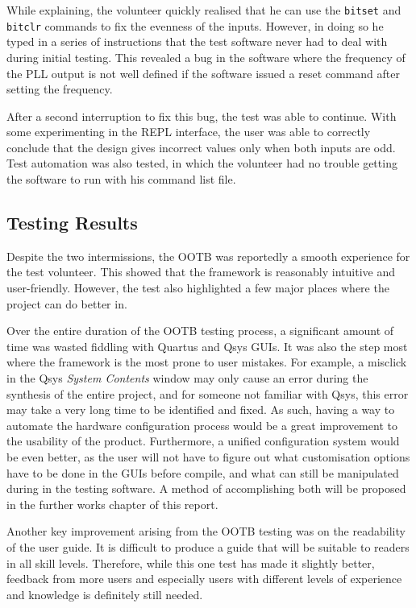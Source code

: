 While explaining, the volunteer quickly realised that he can use the \texttt{bitset} and \texttt{bitclr} commands to fix the evenness of the inputs.
However, in doing so he typed in a series of instructions that the test software never had to deal with during initial testing.
This revealed a bug in the software where the frequency of the PLL output is not well defined if the software issued a reset command after setting the frequency.

After a second interruption to fix this bug, the test was able to continue.
With some experimenting in the REPL interface, the user was able to correctly conclude that the design gives incorrect values only when both inputs are odd.
Test automation was also tested, in which the volunteer had no trouble getting the software to run with his command list file.

\subsection{Testing Results}
Despite the two intermissions, the OOTB was reportedly a smooth experience for the test volunteer.
This showed that the framework is reasonably intuitive and user-friendly.
However, the test also highlighted a few major places where the project can do better in.

Over the entire duration of the OOTB testing process, a significant amount of time was wasted fiddling with Quartus and Qsys GUIs.
It was also the step most where the framework is the most prone to user mistakes.
For example, a misclick in the Qsys \textit{System Contents} window may only cause an error during the synthesis of the entire project, and for someone not familiar with Qsys, this error may take a very long time to be identified and fixed.
As such, having a way to automate the hardware configuration process would be a great improvement to the usability of the product.
Furthermore, a unified configuration system would be even better, as the user will not have to figure out what customisation options have to be done in the GUIs before compile, and what can still be manipulated during in the testing software.
A method of accomplishing both will be proposed in the further works chapter of this report.

Another key improvement arising from the OOTB testing was on the readability of the user guide.
It is difficult to produce a guide that will be suitable to readers in all skill levels.
Therefore, while this one test has made it slightly better, feedback from more users and especially users with different levels of experience and knowledge is definitely still needed.
